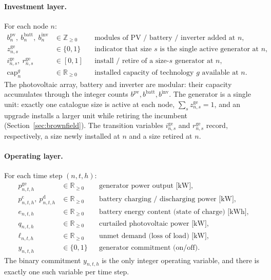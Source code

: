 \documentclass[11pt,a4paper]{article}
\theoremstyle{plain}
\theoremstyle{definition}
\newcommand{\Rpos}{\mathbb{R}_{\geq 0}}
\newcommand{\Zpos}{\mathbb{Z}_{\geq 0}}
\begin{document}
\paragraph{Investment layer.} For each node $n$:
\begin{align}
  b^{\mathrm{pv}}_n,\ b^{\mathrm{batt}}_n,\ b^{\mathrm{inv}}_n &\in \Zpos
    && \text{modules of PV / battery / inverter added at $n$,}\\
  z^{\mathrm{ge}}_{n,s} &\in \{0,1\}
    && \text{indicator that size $s$ is the single active generator at $n$,}\\
  i^{\mathrm{ge}}_{n,s},\ r^{\mathrm{ge}}_{n,s} &\in [0,1]
    && \text{install / retire of a size-$s$ generator at $n$,}\\
  \mathrm{cap}^{g}_n &\in \Rpos
    && \text{installed capacity of technology $g$ available at $n$.}
\end{align}
The photovoltaic array, battery and inverter are modular: their capacity accumulates
through the integer counts $b^{\mathrm{pv}},b^{\mathrm{batt}},b^{\mathrm{inv}}$. The
generator is a single unit: exactly one catalogue size is active at each node,
$\sum_{s}z^{\mathrm{ge}}_{n,s}=1$, and an upgrade installs a larger unit while retiring the
incumbent (Section~\ref{sec:brownfield}). The transition variables
$i^{\mathrm{ge}}_{n,s}$ and $r^{\mathrm{ge}}_{n,s}$ record, respectively, a size
newly installed at $n$ and a size retired at $n$.

\paragraph{Operating layer.} For each time step $(n,t,h)$:
\begin{align}
  p^{\mathrm{ge}}_{n,t,h} &\in \Rpos && \text{generator power output [kW],}\\
  p^{\mathrm{c}}_{n,t,h},\ p^{\mathrm{d}}_{n,t,h} &\in \Rpos
    && \text{battery charging / discharging power [kW],}\\
  e_{n,t,h} &\in \Rpos && \text{battery energy content (state of charge) [kWh],}\\
  q_{n,t,h} &\in \Rpos && \text{curtailed photovoltaic power [kW],}\\
  \ell_{n,t,h} &\in \Rpos && \text{unmet demand (loss of load) [kW],}\\
  y_{n,t,h} &\in \{0,1\} && \text{generator commitment (on/off).}
\end{align}
The binary commitment $y_{n,t,h}$ is the only integer operating variable, and there is
exactly one such variable per time step.
\end{document}
